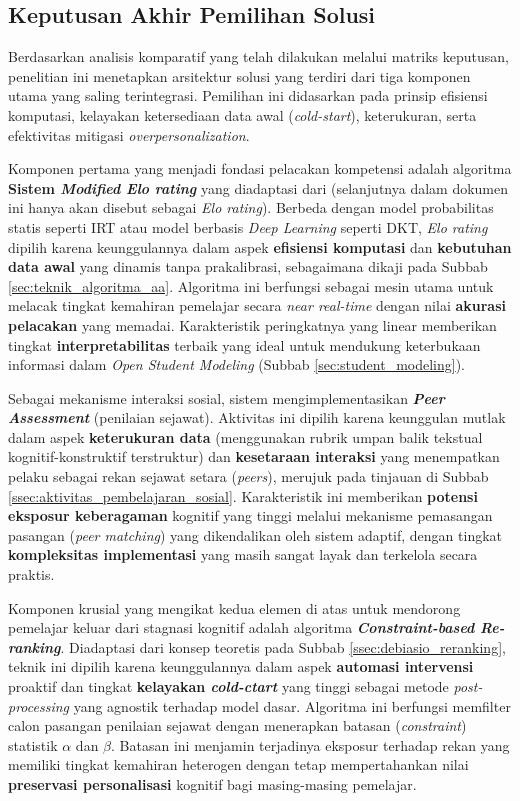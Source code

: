 \subsection{Keputusan Akhir Pemilihan Solusi}
\label{ssec:keputusan_akhir_pemilihan_solusi}

Berdasarkan analisis komparatif yang telah dilakukan melalui matriks keputusan, penelitian ini menetapkan arsitektur solusi yang terdiri dari tiga komponen utama yang saling terintegrasi. Pemilihan ini didasarkan pada prinsip efisiensi komputasi, kelayakan ketersediaan data awal (\textit{cold-start}), keterukuran, serta efektivitas mitigasi \textit{overpersonalization}.

Komponen pertama yang menjadi fondasi pelacakan kompetensi adalah algoritma \textbf{Sistem \textit{Modified Elo rating}} yang diadaptasi dari \textcite{Vesin2022} (selanjutnya dalam dokumen ini hanya akan disebut sebagai \textit{Elo rating}). Berbeda dengan model probabilitas statis seperti IRT atau model berbasis \textit{Deep Learning} seperti DKT, \textit{Elo rating} dipilih karena keunggulannya dalam aspek \textbf{efisiensi komputasi} dan \textbf{kebutuhan data awal} yang dinamis tanpa prakalibrasi, sebagaimana dikaji pada Subbab \ref{sec:teknik_algoritma_aa}. Algoritma ini berfungsi sebagai mesin utama untuk melacak tingkat kemahiran pemelajar secara \textit{near real-time} dengan nilai \textbf{akurasi pelacakan} yang memadai. Karakteristik peringkatnya yang linear memberikan tingkat \textbf{interpretabilitas} terbaik yang ideal untuk mendukung keterbukaan informasi dalam \textit{Open Student Modeling} (Subbab \ref{sec:student_modeling}).

Sebagai mekanisme interaksi sosial, sistem mengimplementasikan \textbf{\textit{Peer Assessment}} (penilaian sejawat). Aktivitas ini dipilih karena keunggulan mutlak dalam aspek \textbf{keterukuran data} (menggunakan rubrik umpan balik tekstual kognitif-konstruktif terstruktur) dan \textbf{kesetaraan interaksi} yang menempatkan pelaku sebagai rekan sejawat setara (\textit{peers}), merujuk pada tinjauan di Subbab \ref{ssec:aktivitas_pembelajaran_sosial}. Karakteristik ini memberikan \textbf{potensi eksposur keberagaman} kognitif yang tinggi melalui mekanisme pemasangan pasangan (\textit{peer matching}) yang dikendalikan oleh sistem adaptif, dengan tingkat \textbf{kompleksitas implementasi} yang masih sangat layak dan terkelola secara praktis.

Komponen krusial yang mengikat kedua elemen di atas untuk mendorong pemelajar keluar dari stagnasi kognitif adalah algoritma \textbf{\textit{Constraint-based Re-ranking}}. Diadaptasi dari konsep teoretis pada Subbab \ref{ssec:debiasio_reranking}, teknik ini dipilih karena keunggulannya dalam aspek \textbf{automasi intervensi} proaktif dan tingkat \textbf{kelayakan \textit{cold-ctart}} yang tinggi sebagai metode \textit{post-processing} yang agnostik terhadap model dasar. Algoritma ini berfungsi memfilter calon pasangan penilaian sejawat dengan menerapkan batasan (\textit{constraint}) statistik $\alpha$ dan $\beta$. Batasan ini menjamin terjadinya eksposur terhadap rekan yang memiliki tingkat kemahiran heterogen dengan tetap mempertahankan nilai \textbf{preservasi personalisasi} kognitif bagi masing-masing pemelajar.

